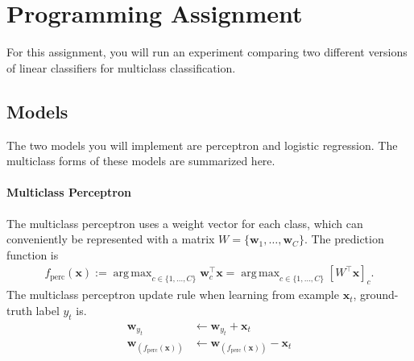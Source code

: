 \documentclass[10pt]{article}
\newcommand{\bx}{{\boldsymbol x}}
\newcommand{\bw}{{\boldsymbol w}}
\DeclareMathOperator*{\argmax}{arg\,max}
\begin{document}
\section*{Programming Assignment}

For this assignment, you will run an experiment comparing two different versions of linear classifiers for multiclass classification. 

\subsection*{Models}

The two models you will implement are perceptron and logistic regression. The multiclass forms of these models are summarized here.

\paragraph{Multiclass Perceptron} The multiclass perceptron uses a weight vector for each class, which can conveniently be represented with a matrix $W = \{\bw_1, \ldots, \bw_C\}$. The prediction function is
\begin{align}
f_{\mathrm{perc}}(\bx) := \argmax_{c \in \{1, \ldots, C\}} \bw_c^\top \bx = \argmax_{c \in \{1, \ldots, C\}} \left[ W^\top \bx \right]_{c}.
\end{align}
The multiclass perceptron update rule when learning from example $\bx_t$, ground-truth label $y_t$ is.
\begin{align}
\bw_{y_t} &\leftarrow \bw_{y_t} + \bx_t\\
\bw_{\left(f_{\mathrm{perc}}(\bx)\right)} &\leftarrow \bw_{\left(f_{\mathrm{perc}}(\bx)\right)} - \bx_t
\end{align}
\end{document}
